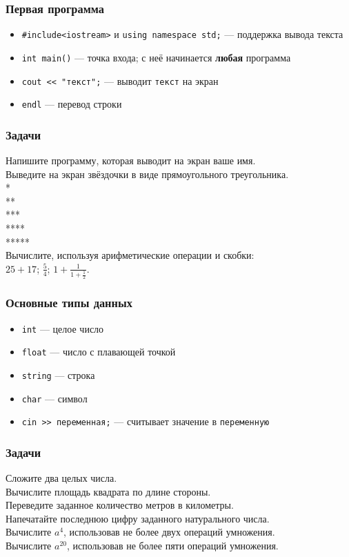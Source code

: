 \documentclass[PDF,10pt,usenames,dvipsnames]{beamer}
\newcommand{\bigqm}[1][1]{\text{\larger[#1]{\textbf{?}}}}
\newcommand{\cpp}[1]{\textcolor{blue!40!black}{\tt #1}} %
\newcommand{\prblm}[1]{{\rm\bigqm[1]} {#1 \\} \vspace{10pt}} %
\begin{document}
\begin{frame}[t] 
	\frametitle{Первая программа} \pause
	\begin{itemize}
		\item	\cpp{\#include<iostream>} и \cpp{using namespace std;} --- поддержка вывода текста \pause
		\item	\cpp{int main()} --- точка входа; с неё начинается {\bf любая} программа \pause
		\item	\cpp{cout << "текст";} --- выводит \cpp{текст} на экран \pause
		\item	\cpp{endl} --- перевод строки \pause
	\end{itemize}
\end{frame}

\begin{frame}[t]
	\frametitle{Задачи} \pause
	\prblm{Напишите программу, которая выводит на экран ваше имя.} \pause
	\prblm{Выведите на экран звёздочки в виде прямоугольного треугольника. \\ *\\ ** \\ *** \\ **** \\ *****} \pause
	\prblm{Вычислите, используя арифметические операции и скобки: \\ \vspace{5pt} $25+17$; \hspace{12pt} $\frac{5}{4}$; \hspace{12pt} $1+\frac{1}{1+\frac{1}{2}}$.} \pause
\end{frame}

\begin{frame}[t]
	\frametitle{Основные типы данных} \pause
	\begin{itemize}
		\item \cpp{int} --- целое число \pause
		\item \cpp{float} --- число с плавающей точкой \pause
		\item \cpp{string} --- строка \pause
		\item \cpp{char} --- символ \pause
		\item	\cpp{cin >> переменная;} --- считывает значение в \cpp{переменную}\pause
	\end{itemize}
\end{frame}

\begin{frame}[t]
	\frametitle{Задачи} \pause
	\prblm{Сложите два целых числа.} \pause
	\prblm{Вычислите площадь квадрата по длине стороны.} \pause
	\prblm{Переведите заданное количество метров в километры.} \pause
	\prblm{Напечатайте последнюю цифру заданного натурального числа.} \pause
	\prblm{Вычислите $a^4$, использовав не более двух операций умножения.} \pause
	\prblm{Вычислите $a^{20}$, использовав не более пяти операций умножения.} \pause
\end{frame}
\end{document}
